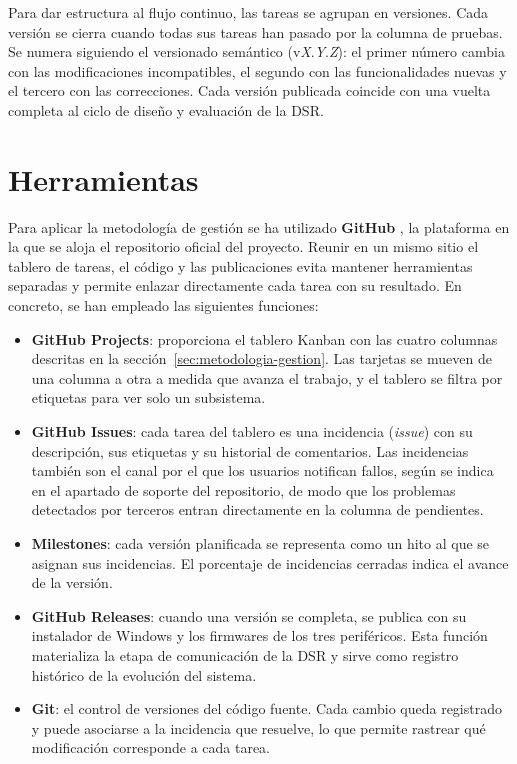 Para dar estructura al flujo continuo, las tareas se agrupan en versiones. Cada versión se cierra cuando todas sus tareas han pasado por la columna de pruebas. Se numera siguiendo el versionado semántico \parencite{semver_web} (v\emph{X}.\emph{Y}.\emph{Z}): el primer número cambia con las modificaciones incompatibles, el segundo con las funcionalidades nuevas y el tercero con las correcciones. Cada versión publicada coincide con una vuelta completa al ciclo de diseño y evaluación de la DSR.

\section{Herramientas}
\label{sec:herramientas}

Para aplicar la metodología de gestión se ha utilizado \textbf{GitHub} \parencite{github_docs}, la plataforma en la que se aloja el repositorio oficial del proyecto. Reunir en un mismo sitio el tablero de tareas, el código y las publicaciones evita mantener herramientas separadas y permite enlazar directamente cada tarea con su resultado. En concreto, se han empleado las siguientes funciones:

\begin{itemize}
	\item \textbf{GitHub Projects}: proporciona el tablero Kanban con las cuatro columnas descritas en la sección~\ref{sec:metodologia-gestion}. Las tarjetas se mueven de una columna a otra a medida que avanza el trabajo, y el tablero se filtra por etiquetas para ver solo un subsistema.
	\item \textbf{GitHub Issues}: cada tarea del tablero es una incidencia (\emph{issue}) con su descripción, sus etiquetas y su historial de comentarios. Las incidencias también son el canal por el que los usuarios notifican fallos, según se indica en el apartado de soporte del repositorio, de modo que los problemas detectados por terceros entran directamente en la columna de pendientes.
	\item \textbf{Milestones}: cada versión planificada se representa como un hito al que se asignan sus incidencias. El porcentaje de incidencias cerradas indica el avance de la versión.
	\item \textbf{GitHub Releases}: cuando una versión se completa, se publica con su instalador de Windows y los firmwares de los tres periféricos. Esta función materializa la etapa de comunicación de la DSR y sirve como registro histórico de la evolución del sistema.
	\item \textbf{Git}: el control de versiones del código fuente. Cada cambio queda registrado y puede asociarse a la incidencia que resuelve, lo que permite rastrear qué modificación corresponde a cada tarea.
\end{itemize}

